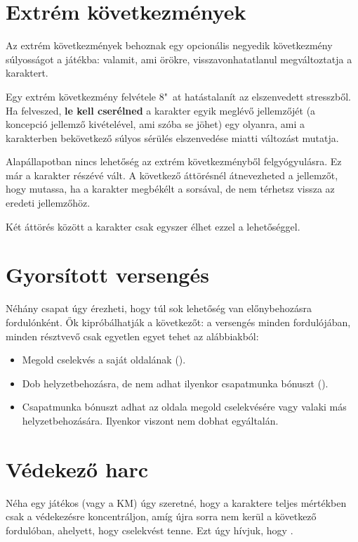\section{Extrém következmények}

Az extrém következmények behoznak egy opcionális negyedik következmény súlyosságot a játékba: valamit, ami örökre, visszavonhatatlanul megváltoztatja a karaktert.

Egy extrém következmény felvétele 8"~at hatástalanít az elszenvedett stresszből. Ha felveszed, \textbf{le kell cserélned} a karakter egyik meglévő jellemzőjét (a koncepció jellemző kivételével, ami szóba se jöhet) egy olyanra, ami a karakterben bekövetkező súlyos sérülés elszenvedése miatti változást mutatja.

Alapállapotban nincs lehetőség az extrém következményből felgyógyulásra. Ez már a karakter részévé vált. A következő áttörésnél átnevezheted a jellemzőt, hogy mutassa, ha a karakter megbékélt a sorsával, de nem térhetsz vissza az eredeti jellemzőhöz.

Két áttörés között a karakter csak egyszer élhet ezzel a lehetőséggel.

\section{Gyorsított versengés}

Néhány csapat úgy érezheti, hogy túl sok lehetőség van előnybehozásra fordulónként. Ők kipróbálhatják a következőt: a versengés minden fordulójában, minden résztvevő csak egyetlen egyet tehet az alábbiakból:

\begin{itemize}
    \item Megold cselekvés a saját oldalának ().
    \item Dob helyzetbehozásra, de nem adhat ilyenkor csapatmunka bónuszt ().
    \item Csapatmunka bónuszt adhat az oldala megold cselekvésére vagy valaki más helyzetbehozására. Ilyenkor viszont nem dobhat egyáltalán.
\end{itemize}

\section{Védekező harc}

Néha egy játékos (vagy a KM) úgy szeretné, hogy a karaktere teljes mértékben csak a védekezésre koncentráljon, amíg újra sorra nem kerül a következő fordulóban, ahelyett, hogy cselekvést tenne. Ezt úgy hívjuk, hogy .

